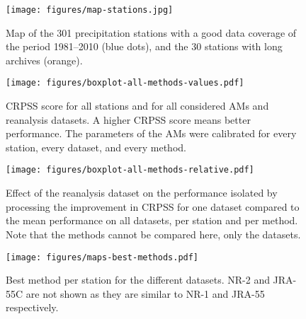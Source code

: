 \documentclass{ametsoc}
\begin{document}
%

\begin{figure}[t]
  \noindent\texttt{[image: figures/map-stations.jpg]}\\
  \caption{Map of the 301 precipitation stations with a good data coverage of the period 1981--2010 (blue dots), and the 30 stations with long archives (orange).}
	\label{fig:stations}
\end{figure}

\begin{figure}[t]
	\noindent\texttt{[image: figures/boxplot-all-methods-values.pdf]}\\
	\caption{CRPSS score for all stations and for all considered AMs and reanalysis datasets. A higher CRPSS score means better performance. The parameters of the AMs were calibrated for every station, every dataset, and every method.}
	\label{fig:comparison_values}
\end{figure}

\begin{figure}[t]
	\noindent\texttt{[image: figures/boxplot-all-methods-relative.pdf]}\\
	\caption{Effect of the reanalysis dataset on the performance isolated by processing the improvement in CRPSS for one dataset compared to the mean performance on all datasets, per station and per method. Note that the methods cannot be compared here, only the datasets.}
	\label{fig:comparison_relative}
\end{figure}

\begin{figure}[t]
	\noindent\texttt{[image: figures/maps-best-methods.pdf]}\\
	\caption{Best method per station for the different datasets. NR-2 and JRA-55C are not shown as they are similar to NR-1 and JRA-55 respectively.}
	\label{fig:map_best_methods}
\end{figure}
\end{document}
